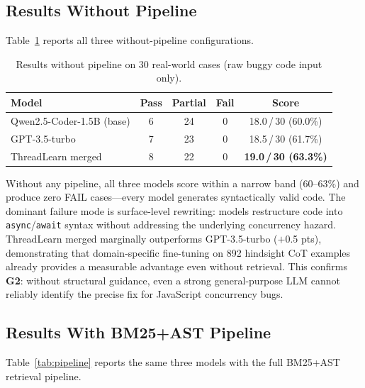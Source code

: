 \documentclass[runningheads]{llncs}
\begin{document}
\subsection{Results Without Pipeline}
\label{sec:eval:nopipeline}

Table~\ref{tab:nopipeline} reports all three without-pipeline configurations.

\begin{table}[H]
  \centering
  \caption{Results without pipeline on 30 real-world cases (raw buggy code input only).}
  \label{tab:nopipeline}
  \begin{tabular}{@{}lcccc@{}}
    \toprule
    \textbf{Model} & \textbf{Pass} & \textbf{Partial} & \textbf{Fail} & \textbf{Score} \\
    \midrule
    Qwen2.5-Coder-1.5B (base)  & 6  & 24 & 0 & 18.0\,/\,30 (60.0\%) \\
    GPT-3.5-turbo               & 7  & 23 & 0 & 18.5\,/\,30 (61.7\%) \\
    ThreadLearn merged          & 8  & 22 & 0 & \textbf{19.0\,/\,30 (63.3\%)} \\
    \bottomrule
  \end{tabular}
\end{table}

Without any pipeline, all three models score within a narrow band
(60--63\%) and produce zero FAIL cases---every model generates syntactically
valid code.
The dominant failure mode is surface-level rewriting: models restructure
code into \texttt{async}/\texttt{await} syntax without addressing the
underlying concurrency hazard.
ThreadLearn merged marginally outperforms GPT-3.5-turbo ($+$0.5 pts), demonstrating
that domain-specific fine-tuning on 892 hindsight CoT examples already
provides a measurable advantage even without retrieval.
This confirms \textbf{G2}: without structural guidance, even a strong
general-purpose LLM cannot reliably identify the precise fix for
JavaScript concurrency bugs.

\subsection{Results With BM25+AST Pipeline}
\label{sec:eval:pipeline}

Table~\ref{tab:pipeline} reports the same three models with the full
BM25+AST retrieval pipeline.
\end{document}
